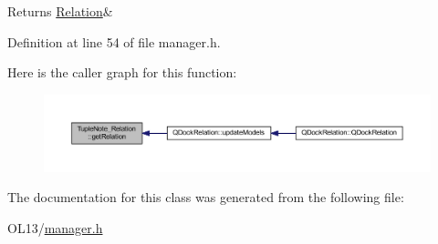 \begin{DoxyReturn}{Returns}
\hyperlink{class_relation}{Relation}\& 
\end{DoxyReturn}


Definition at line 54 of file manager.\+h.

Here is the caller graph for this function\+:\nopagebreak
\begin{figure}[H]
\begin{center}
\leavevmode
\includegraphics[width=350pt]{class_tuple_note___relation_ad326a5fee3d7bec52bda9e0234377d8e_icgraph}
\end{center}
\end{figure}


The documentation for this class was generated from the following file\+:\begin{DoxyCompactItemize}
\item 
O\+L13/\hyperlink{manager_8h}{manager.\+h}\end{DoxyCompactItemize}
